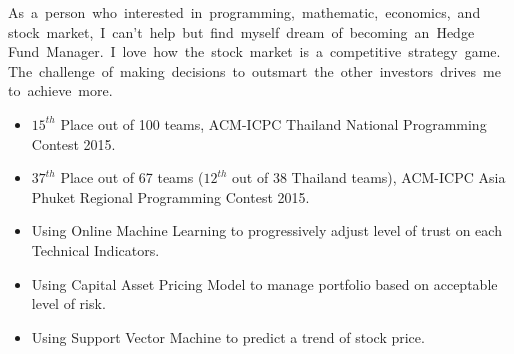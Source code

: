 %


As\, a\, person\, who\, interested\, in\, programming,\, mathematic,\, economics,\, and\, stock\, market,\, I\, can't\, help\, but\, find\, myself\, dream\, of\, becoming\, an\, Hedge\, Fund\, Manager.\, 
I\, love\, how\, the\, stock\, market\, is\, a\, competitive\, strategy\, game.\, The\, challenge\, of\, making\, decisions\, to\, outsmart\, the\, other\, investors\, drives\, me\, to\, achieve\, more.


%
%
%


\bigskip



\begin{itemize}
	\item $15^{th}$ Place out of 100 teams, ACM-ICPC Thailand National Programming Contest 2015.
	\item $37^{th}$ Place out of 67 teams ($12^{th}$ out of 38 Thailand teams), ACM-ICPC Asia Phuket Regional Programming Contest 2015.
\end{itemize}

\divider

\begin{itemize}
	\item Using Online Machine Learning to progressively adjust level of trust on each Technical Indicators.
	\item Using Capital Asset Pricing Model to manage portfolio based on acceptable level of risk.
	\item Using Support Vector Machine to predict a trend of stock price.
\end{itemize}

